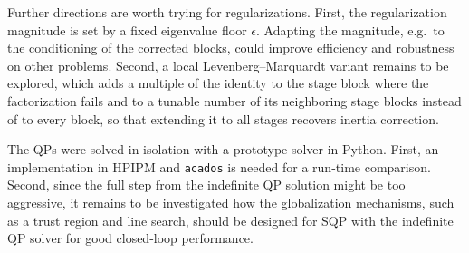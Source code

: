 \documentclass[class=scrbook, crop=false]{standalone}
\begin{document}
Further directions are worth trying for regularizations.
First, the regularization magnitude is set by a fixed eigenvalue floor $\epsilon$.
Adapting the magnitude, e.g.\ to the conditioning of the corrected blocks, could improve efficiency and robustness on other problems.
Second, a local Levenberg--Marquardt variant remains to be explored,
which adds a multiple of the identity to the stage block where the factorization fails 
and to a tunable number of its neighboring stage blocks instead of to every block, 
so that extending it to all stages recovers inertia correction.

The QPs were solved in isolation with a prototype solver in Python.
First, an implementation in HPIPM and \texttt{acados} is needed for a run-time comparison.
Second, since the full step from the indefinite QP solution might be too aggressive,
it remains to be investigated how the globalization mechanisms, such as a trust region and line search,
should be designed for SQP with the indefinite QP solver for good closed-loop performance.
\end{document}
